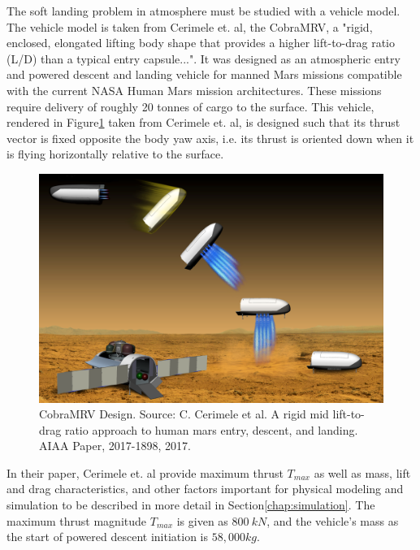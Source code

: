 The soft landing problem in atmosphere must be studied with a vehicle model. The vehicle model is taken from Cerimele et. al\:\cite{CERIMELE}, the CobraMRV, a "rigid, enclosed, elongated lifting body shape that provides a higher lift-to-drag ratio (L/D) than a typical entry capsule...". It was designed as an atmospheric entry and powered descent and landing vehicle for manned Mars missions compatible with the current NASA Human Mars mission architectures. These missions require delivery of roughly 20 tonnes of cargo to the surface. This vehicle, rendered in Figure\:\ref{fig:CobraMRV} taken from Cerimele et. al, is designed such that its thrust vector is fixed opposite the body yaw axis, i.e. its thrust is oriented down when it is flying horizontally relative to the surface. 

\begin{figure}[H]
	\centering
	\begin{minipage}{4.5 in}
		\includegraphics[width=\linewidth]{Figures/CobraMRV.png}
		\caption{CobraMRV Design. Source: C. Cerimele et al. A rigid mid lift-to-drag ratio approach to human mars entry, descent,
			and landing. AIAA Paper, 2017-1898, 2017. \label{fig:CobraMRV} }
	\end{minipage}
\end{figure}

In their paper, Cerimele et. al\:\cite{CERIMELE} provide maximum thrust $T_{max}$ as well as mass, lift and drag characteristics, and other factors important for physical modeling and simulation to be described in more detail in Section\:\ref{chap:simulation}. The maximum thrust magnitude $T_{max}$ is given as $800\:kN$, and the vehicle's mass as the start of powered descent initiation is $58,000 kg$. 


